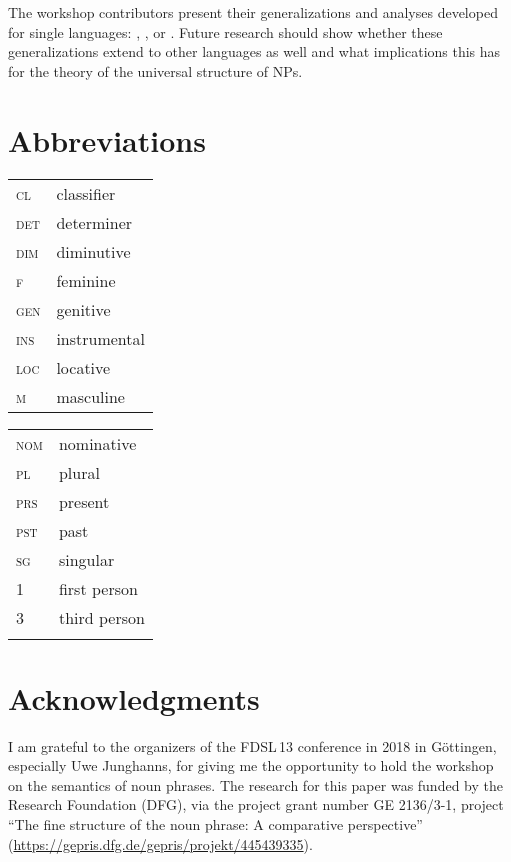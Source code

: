 \documentclass[output=paper]{langscibook}
\begin{document}
The workshop contributors present their generalizations and analyses developed for single languages: , , or . Future research should show whether these generalizations extend to other  languages as well and what implications this has for the theory of the universal structure of NPs.

\section*{Abbreviations}

\begin{tabularx}{.5\textwidth}{@{}lX}
\textsc{cl}&{classifier}\\
\textsc{det}&{determiner}\\
\textsc{dim}&{diminutive}\\
\textsc{f}&{feminine}\\
\textsc{gen}&{genitive}\\
\textsc{ins}&{instrumental}\\
\textsc{loc}&{locative}\\
\textsc{m}&{masculine}\\
\end{tabularx}%
\begin{tabularx}{.5\textwidth}{lX@{}}
\textsc{nom}&{nominative}\\
\textsc{pl}&{plural}\\
\textsc{prs}&{present}\\
\textsc{pst}&{past}\\
\textsc{sg}&{singular}\\
\textsc{1}&{first person}\\
\textsc{3}&{third person}\\
&\\
\end{tabularx}

\section*{Acknowledgments}
I am grateful to the organizers of the FDSL\,13 conference in 2018 in Göttingen, especially Uwe Junghanns, for giving me the opportunity to hold the workshop on the semantics of noun phrases. The research for this paper was funded by the  Research Foundation (DFG), via the project grant number GE 2136/3-1, project ``The fine structure of the  noun phrase: A comparative perspective'' (\url{https://gepris.dfg.de/gepris/projekt/445439335}).

{\sloppy\printbibliography[heading=subbibliography,notkeyword=this]}
\end{document}
